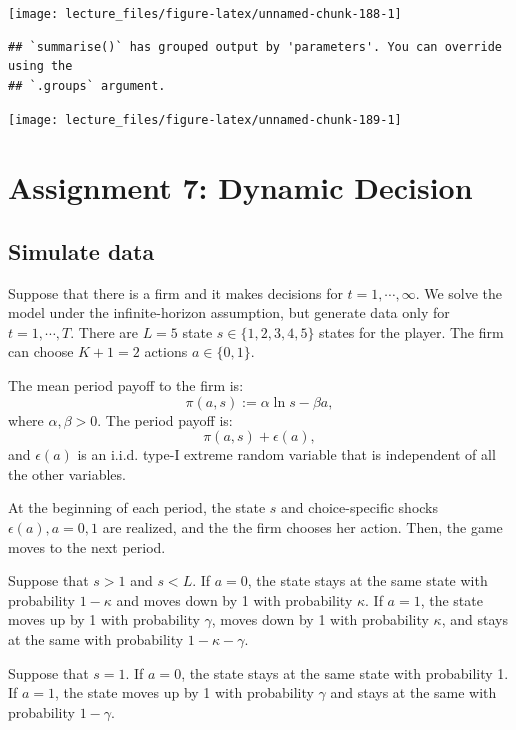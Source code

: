 \documentclass[
]{book}
\begin{document}
\begin{center}\texttt{[image: lecture\_files/figure-latex/unnamed-chunk-188-1]} \end{center}

\begin{verbatim}
## `summarise()` has grouped output by 'parameters'. You can override using the
## `.groups` argument.
\end{verbatim}

\begin{center}\texttt{[image: lecture\_files/figure-latex/unnamed-chunk-189-1]} \end{center}

\hypertarget{assignment7}{%
\chapter{Assignment 7: Dynamic Decision}\label{assignment7}}

\hypertarget{simulate-data-6}{%
\section{Simulate data}\label{simulate-data-6}}

Suppose that there is a firm and it makes decisions for \(t = 1, \cdots, \infty\). We solve the model under the infinite-horizon assumption, but generate data only for \(t = 1, \cdots, T\). There are \(L = 5\) state \(s \in \{1, 2, 3, 4, 5\}\) states for the player. The firm can choose \(K + 1 = 2\) actions \(a \in \{0, 1\}\).

The mean period payoff to the firm is:
\[
\pi(a, s) :=  \alpha \ln s - \beta a,
\]
where \(\alpha, \beta > 0\). The period payoff is:
\[
\pi(a, s) + \epsilon(a),
\]
and \(\epsilon(a)\) is an i.i.d. type-I extreme random variable that is independent of all the other variables.

At the beginning of each period, the state \(s\) and choice-specific shocks \(\epsilon(a), a = 0, 1\) are realized, and the the firm chooses her action. Then, the game moves to the next period.

Suppose that \(s > 1\) and \(s < L\). If \(a = 0\), the state stays at the same state with probability \(1 - \kappa\) and moves down by 1 with probability \(\kappa\). If \(a = 1\), the state moves up by 1 with probability \(\gamma\), moves down by 1 with probability \(\kappa\), and stays at the same with probability \(1 - \kappa - \gamma\).

Suppose that \(s = 1\). If \(a = 0\), the state stays at the same state with probability 1. If \(a = 1\), the state moves up by 1 with probability \(\gamma\) and stays at the same with probability \(1 - \gamma\).
\end{document}
